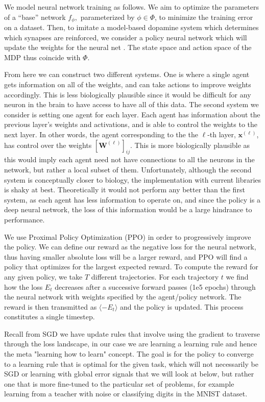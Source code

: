 \documentclass{article}
\def\*#1{\mathbf{#1}}
\begin{document}
We model neural network training as follows. We aim to optimize the parameters of a ``base'' network $f_{\phi},$ parameterized by $\phi \in \Phi$, to minimize the training error on a dataset. Then, to imitate a model-based dopamine
system which determines which synapses are reinforced, we consider a policy
neural network which will update the weights for the neural net \cite{wang2018pfc, botvinick2019408}. The state space and action space of the MDP thus coincide with $\Phi$.

From here we can construct two different
systems. One is where a single agent gets information on all of the weights,
and can take actions to improve weights accordingly. This is less biologically plausible since it would be difficult
for any neuron in the brain to have access to have all of this data. The second system we consider is setting one agent
for each layer. Each agent has information about the previous layer's weights and activations, and is able to control
the weights to the next layer. In other words, the agent corresponding to the the $\ell$-th layer, $\*x^{(\ell)}$, has control over the weights 
$[\*W^{(\ell)}]_{ij}$. This is more biologically plausible as this would imply each agent need not have connections to all the neurons in 
the network, but rather a local subset of them. Unfortunately, although the second system is conceptually closer to biology, the implementation
with current libraries is shaky at best. Theoretically it would not perform any better than the first system, as each agent has less information
to operate on, and since the policy is a deep neural network, the loss of this information would be a large hindrance to performance.

We use Proximal Policy Optimization (PPO) in order to progressively improve the policy. We can define
our reward as the negative loss for the neural network, thus having smaller absolute loss will be a larger reward, and
PPO will find a policy that optimizes for the largest expected reward. To compute the reward for any given policy, we 
take $T$ different trajectories. For each trajectory $t$ we find how the loss $E_t$ 
decreases after a successive forward passes (1e5 epochs) through the neural 
network with weights specified by the agent/policy network. The reward is 
then transmitted as $\langle - E_t \rangle$ and the policy is updated. This process constitutes a single timestep.

Recall from SGD we have update rules that involve using the gradient to traverse through the loss landscape,
in our case we are learning a learning rule and hence the meta "learning how to learn" concept. The goal is for
the policy to converge to a learning rule that is optimal for the given task, which will not necessarily be SGD
or learning with global error signals that we will look at below, but rather one that is more fine-tuned to the particular
set of problems, for example learning from a teacher with noise or classifying digits in the MNIST dataset.
\end{document}
